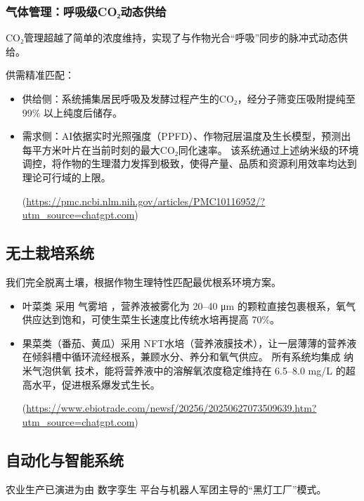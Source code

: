 \subsubsection{气体管理：呼吸级CO₂动态供给}\label{ux6c14ux4f53ux7ba1ux7406ux547cux5438ux7ea7coux2082ux52a8ux6001ux4f9bux7ed9}

CO₂管理超越了简单的浓度维持，实现了与作物光合``呼吸''同步的脉冲式动态供给。

供需精准匹配：

\begin{itemize}
\item
  供给侧：系统捕集居民呼吸及发酵过程产生的CO₂，经分子筛变压吸附提纯至99\% 以上纯度后储存。
\item
  需求侧：AI依据实时光照强度（PPFD）、作物冠层温度及生长模型，预测出每平方米叶片在当前时刻的最大CO₂同化速率。
  该系统通过上述纳米级的环境调控，将作物的生理潜力发挥到极致，使得产量、品质和资源利用效率均达到理论可行域的上限。

(\url{https://pmc.ncbi.nlm.nih.gov/articles/PMC10116952/?utm\_source=chatgpt.com})
\end{itemize}

\subsection{无土栽培系统}\label{ux65e0ux571fux683dux57f9ux7cfbux7edf}

我们完全脱离土壤，根据作物生理特性匹配最优根系环境方案。

\begin{itemize}
\item
  叶菜类 采用 气雾培 ，营养液被雾化为 20--40 μm 的颗粒直接包裹根系，氧气供应达到饱和，可使生菜生长速度比传统水培再提高 70\%。
\item
  果菜类（番茄、黄瓜）采用 NFT水培（营养液膜技术），让一层薄薄的营养液在倾斜槽中循环流经根系，兼顾水分、养分和氧气供应。
  所有系统均集成 纳米气泡供氧 技术，能将营养液中的溶解氧浓度稳定维持在 6.5--8.0 mg/L 的超高水平，促进根系爆发式生长。

(\url{https://www.ebiotrade.com/newsf/20256/20250627073509639.htm?utm\_source=chatgpt.com})
\end{itemize}

\subsection{自动化与智能系统}\label{ux81eaux52a8ux5316ux4e0eux667aux80fdux7cfbux7edf}

农业生产已演进为由 数字孪生 平台与机器人军团主导的``黑灯工厂''模式。

